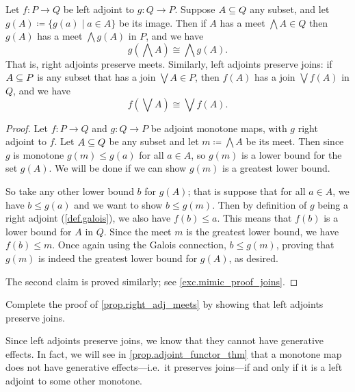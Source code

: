 \documentclass[7Sketches]{subfiles}
\begin{document}
\begin{proposition}%
\label{prop.right_adj_meets}%
%
%
  Let $f\colon P\to Q$ be left adjoint to $g\colon Q\to P$. Suppose $A\ss Q$ any subset, and let $g(A)\coloneqq\{g(a)\mid a\in A\}$ be its image. Then if $A$ has a meet $\bigwedge A\in Q$ then $g(A)$ has a meet $\bigwedge g(A)$ in $P$, and we have
  \[g\left(\bigwedge A\right)\cong\bigwedge g(A).\]
That is, right adjoints preserve meets. Similarly, left adjoints preserve joins: if $A\ss P$ is any subset that has a join $\bigvee A\in P$, then $f(A)$ has a join $\bigvee f(A)$ in $Q$, and we have
  \[f\left(\bigvee A\right)\cong\bigvee f(A).\]  
\end{proposition}
\begin{proof}
  Let $f\colon P \to Q$ and $g\colon Q \to P$ be adjoint monotone maps, with $g$
  right adjoint to $f$. Let $A\ss Q$ be any subset and let $m\coloneqq\bigwedge A$ be
  its meet. Then since $g$ is monotone $g(m) \le g(a)$ for all $a \in A$, so $g(m)$ is a
  lower bound for the set $g(A)$. We will be done if we can show $g(m)$ is a greatest 
  lower bound. 

  So take any other lower bound $b$ for $g(A)$; that is suppose that for all $a\in A$, we have $b\leq g(a)$ and we want to show $b\leq g(m)$. Then by definition of $g$ being a right adjoint (\cref{def.galois}), we also have $f(b)\leq a$. This means that $f(b)$ is a
  lower bound for $A$ in $Q$. Since the meet $m$ is the greatest lower bound, we
  have $f(b)\leq m$. Once again using the Galois connection, $b\leq g(m)$, proving that $g(m)$ is indeed the greatest lower bound for $g(A)$, as desired. 
  
  The second claim is proved similarly; see \cref{exc.mimic_proof_joins}.
\end{proof}

\begin{exercise}%
\label{exc.mimic_proof_joins}
  Complete the proof of \cref{prop.right_adj_meets} by showing that left adjoints preserve joins.
\end{exercise}

Since left adjoints preserve joins, we know that they cannot have generative
effects. In fact, we will see in \cref{prop.adjoint_functor_thm} that a monotone map does not have generative effects---i.e.\ it preserves joins---if and only if it is a left adjoint to some other monotone.
\end{document}
